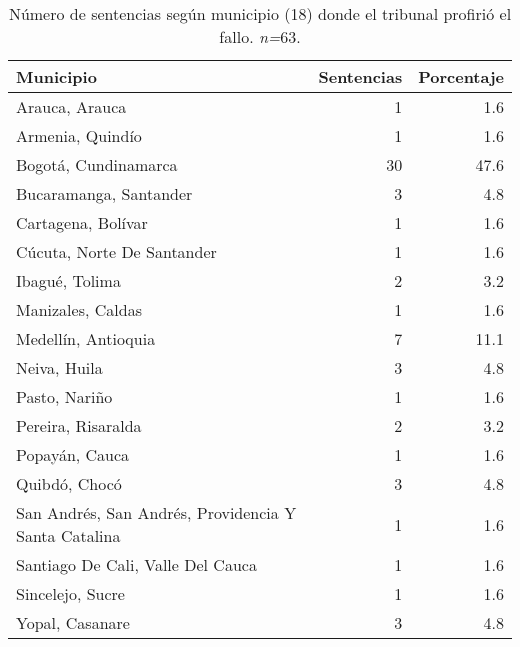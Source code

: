\begin{table}[!htbp]
\centering
\caption{Número de sentencias según municipio (18) donde el tribunal profirió el fallo. \textit{n=}63.} 
\label{tab:munfal}
\begin{tabular}{lrr}
  \hline
Municipio & Sentencias & Porcentaje \\ 
  \hline
Arauca, Arauca &  1 & 1.6 \\ 
  Armenia, Quindío &  1 & 1.6 \\ 
  Bogotá, Cundinamarca & 30 & 47.6 \\ 
  Bucaramanga, Santander &  3 & 4.8 \\ 
  Cartagena, Bolívar &  1 & 1.6 \\ 
  Cúcuta, Norte De Santander &  1 & 1.6 \\ 
  Ibagué, Tolima &  2 & 3.2 \\ 
  Manizales, Caldas &  1 & 1.6 \\ 
  Medellín, Antioquia &  7 & 11.1 \\ 
  Neiva, Huila &  3 & 4.8 \\ 
  Pasto, Nariño &  1 & 1.6 \\ 
  Pereira, Risaralda &  2 & 3.2 \\ 
  Popayán, Cauca &  1 & 1.6 \\ 
  Quibdó, Chocó &  3 & 4.8 \\ 
  San Andrés, San Andrés, Providencia Y Santa Catalina &  1 & 1.6 \\ 
  Santiago De Cali, Valle Del Cauca &  1 & 1.6 \\ 
  Sincelejo, Sucre &  1 & 1.6 \\ 
  Yopal, Casanare &  3 & 4.8 \\ 
   \hline
\end{tabular}
\end{table}
